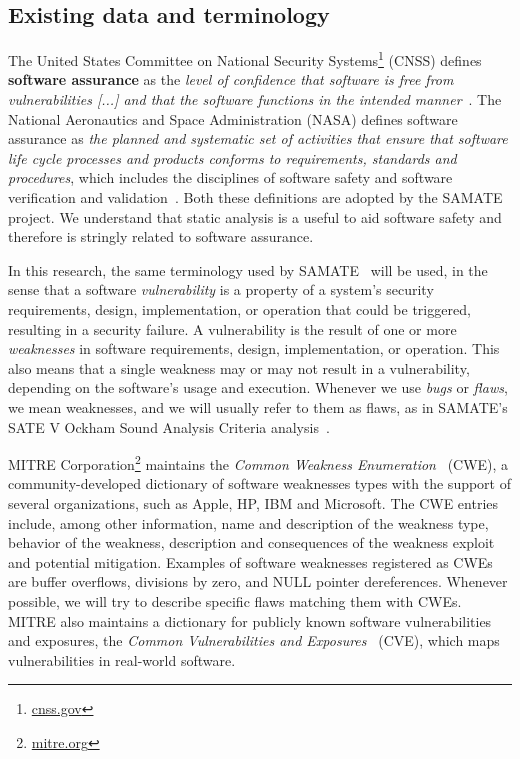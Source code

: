 \subsection{Existing data and terminology}
\label{sub:terminology}

The United States Committee on National Security
Systems\footnote{\url{cnss.gov}} (CNSS) defines \textbf{software assurance} as
the \textit{level of confidence that software is free from vulnerabilities [...]
and that the software functions in the intended
manner}~\cite{instruction20034009}. The National Aeronautics and Space
Administration (NASA) defines software assurance as \textit{the planned and
systematic set of activities that ensure that software life cycle processes and
products conforms to requirements, standards and procedures}, which includes
the disciplines of software safety and software verification and
validation~\cite{nasastd8739}. Both these definitions are adopted by the SAMATE
project. We understand that static analysis is a useful to aid software safety
and therefore is stringly related to software assurance.

In this research, the same terminology used by
SAMATE~\cite{black_counting_2011} will be used, in the sense that a software
\textit{vulnerability} is a property of a system's security requirements,
design, implementation, or operation that could be triggered, resulting in a
security failure. A vulnerability is the result of one or more
\textit{weaknesses} in software requirements, design, implementation, or
operation. This also means that a single weakness may or may not result in a
vulnerability, depending on the software's usage and execution. Whenever we use
\textit{bugs} or \textit{flaws}, we mean weaknesses, and we will usually refer
to them as flaws, as in SAMATE's SATE V Ockham Sound Analysis Criteria
analysis~\cite{black_sate_2016}.

MITRE Corporation\footnote{\url{mitre.org}} maintains the \textit{Common Weakness
Enumeration}~\cite{cwe_page} (CWE), a community-developed dictionary of
software weaknesses types with the support of several organizations, such as Apple,
HP, IBM and Microsoft. The CWE entries include, among other information, name
and description of the weakness type, behavior of the weakness, description and
consequences of the weakness exploit and potential mitigation. Examples of
software weaknesses registered as CWEs are buffer overflows, divisions by zero,
and NULL pointer dereferences. Whenever possible, we will try to describe
specific flaws matching them with CWEs. MITRE also maintains a dictionary for
publicly known software vulnerabilities and exposures, the \textit{Common
Vulnerabilities and Exposures}~\cite{cve_page} (CVE), which maps vulnerabilities
in real-world software.

